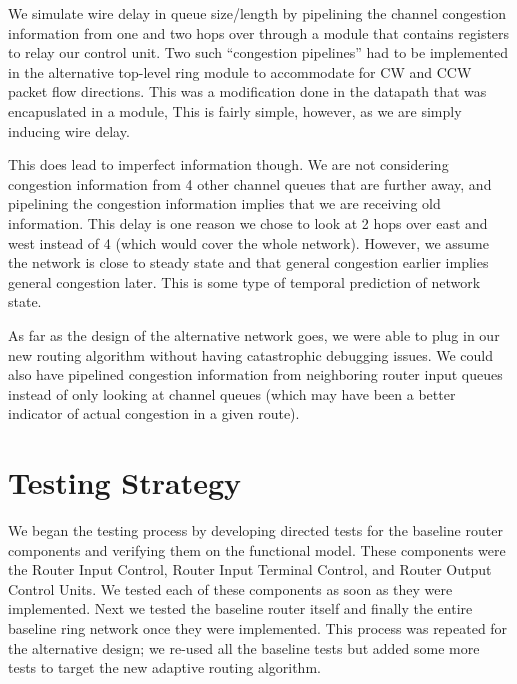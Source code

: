\documentclass[10pt]{article}
\begin{document}
We simulate wire delay in queue size/length by pipelining the channel congestion
information from one and two hops over through a module that contains registers 
to relay our control unit. Two such ``congestion pipelines'' had to be implemented
in the alternative top-level ring module to accommodate for CW and CCW packet flow
directions.
This was a modification done in the datapath that was encapuslated in a 
module, 
This is fairly simple, however, as we are simply inducing wire delay. \par
This does lead to imperfect information though. We are not considering congestion 
information from 4 other channel queues that are further away, and pipelining the 
congestion information implies that we are receiving old information. This delay 
is one reason we chose to look at 2 hops over east and west instead of 4 (which 
would cover the whole network). 
However, we assume the network is close to steady state and that general 
congestion earlier implies general congestion later. 
This is some type of temporal prediction of network state. \par

As far as the design of the alternative network goes, we were able to plug in our
new routing algorithm without having catastrophic debugging issues. We could also 
have pipelined congestion information from neighboring router input queues instead 
of only looking at channel queues (which may have been a better indicator of actual
congestion in a given route). 

\section{Testing Strategy}

We began the testing process by developing directed tests for the baseline router 
components and verifying them on the functional model. These components were the 
Router Input Control, Router Input Terminal Control, and Router Output Control 
Units. We tested each of these components as soon as they were implemented. Next
we tested the baseline router itself and finally the entire baseline ring network
once they were implemented. This process was repeated for the alternative 
design; we re-used all the baseline tests but added some more tests to target the 
new adaptive routing algorithm. 
\end{document}
